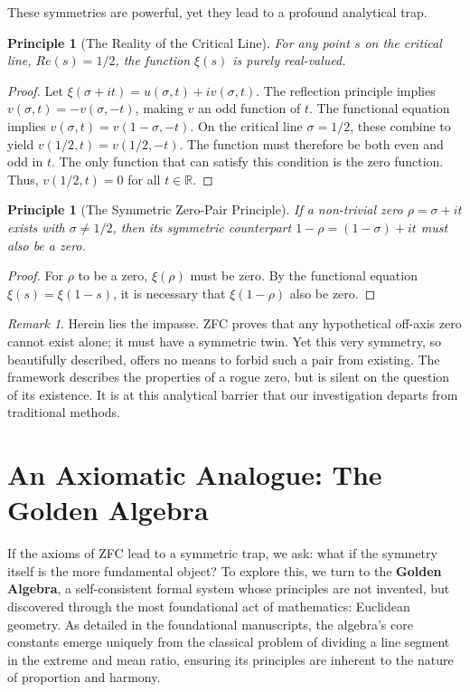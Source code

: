 \documentclass{article}
\theoremstyle{plain}
\newtheorem{principle}[theorem]{Principle}
\theoremstyle{definition}
\theoremstyle{remark}
\newtheorem*{remark}{Remark}
\begin{document}
These symmetries are powerful, yet they lead to a profound analytical trap.

\begin{principle}[The Reality of the Critical Line]
For any point $s$ on the critical line, $Re(s)=1/2$, the function $\xi(s)$ is purely real-valued. 
\end{principle}
\begin{proof}
Let $\xi(\sigma+it) = u(\sigma,t) + iv(\sigma,t)$. The reflection principle implies $v(\sigma,t) = -v(\sigma,-t)$, making $v$ an odd function of $t$. The functional equation implies $v(\sigma,t) = v(1-\sigma,-t)$. On the critical line $\sigma=1/2$, these combine to yield $v(1/2, t) = v(1/2, -t)$. The function must therefore be both even and odd in $t$. The only function that can satisfy this condition is the zero function. Thus, $v(1/2, t) = 0$ for all $t \in \mathbb{R}$.
\end{proof}

\begin{principle}[The Symmetric Zero-Pair Principle]
If a non-trivial zero $\rho = \sigma + it$ exists with $\sigma \neq 1/2$, then its symmetric counterpart $1-\rho = (1-\sigma)+it$ must also be a zero. 
\end{principle}
\begin{proof}
For $\rho$ to be a zero, $\xi(\rho)$ must be zero. By the functional equation $\xi(s) = \xi(1-s)$, it is necessary that $\xi(1-\rho)$ also be zero.
\end{proof}

\begin{remark}
Herein lies the impasse. ZFC proves that any hypothetical off-axis zero cannot exist alone; it must have a symmetric twin. Yet this very symmetry, so beautifully described, offers no means to forbid such a pair from existing. The framework describes the properties of a rogue zero, but is silent on the question of its existence. It is at this analytical barrier that our investigation departs from traditional methods.
\end{remark}

\section{An Axiomatic Analogue: The Golden Algebra}
\label{sec:algebra}

If the axioms of ZFC lead to a symmetric trap, we ask: what if the symmetry itself is the more fundamental object? To explore this, we turn to the \textbf{Golden Algebra}, a self-consistent formal system whose principles are not invented, but discovered through the most foundational act of mathematics: Euclidean geometry. As detailed in the foundational manuscripts, the algebra's core constants emerge uniquely from the classical problem of dividing a line segment in the extreme and mean ratio, ensuring its principles are inherent to the nature of proportion and harmony.
\end{document}
